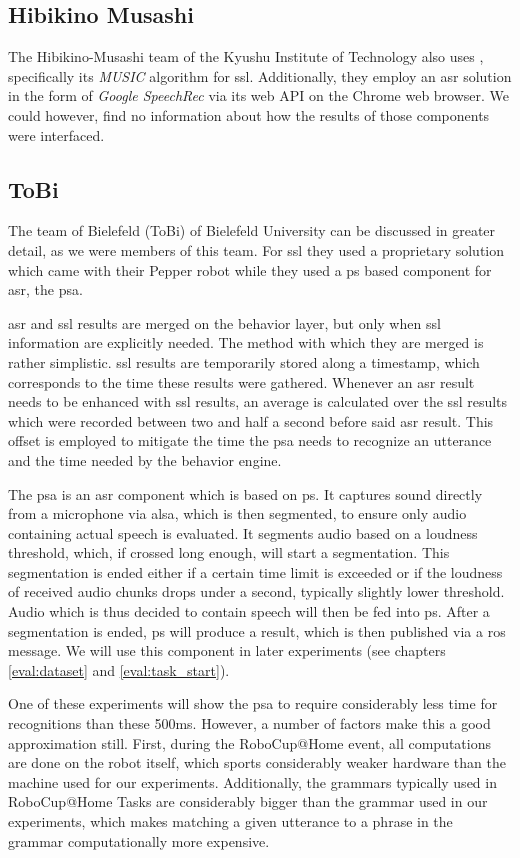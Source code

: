 \subsection{Hibikino Musashi}
The Hibikino-Musashi team of the Kyushu Institute of Technology also uses \HARK, specifically its \textit{MUSIC} algorithm for \gls{ssl}.
Additionally, they employ an \gls{asr} solution in the form of \textit{Google SpeechRec} via its web API on the Chrome web browser.
We could however, find no information about how the results of those components were interfaced.

\subsection{ToBi}
The team of Bielefeld (ToBi) of Bielefeld University can be discussed in greater detail, as we were members of this team.
For \gls{ssl} they used a proprietary solution which came with their Pepper robot %
while they used a \gls{ps} based component for \gls{asr}, the \gls{psa}. 

\gls{asr} and \gls{ssl} results are merged on the behavior layer, but only when \gls{ssl} information are explicitly needed.
The method with which they are merged is rather simplistic.
\gls{ssl} results are temporarily stored along a timestamp, which corresponds to the time these results were gathered.
Whenever an \gls{asr} result needs to be enhanced with \gls{ssl} results, an average is calculated over the \gls{ssl} results which were recorded between two and half a second before said \gls{asr} result.
This offset is employed to mitigate the time the \gls{psa} needs to recognize an utterance and the time needed by the behavior engine. 

The \gls{psa} is an \gls{asr} component which is based on \gls{ps}. \label{related_work:psa}
It captures sound directly from a microphone via \gls{alsa}, which is then segmented, to ensure only audio containing actual speech is evaluated.
It segments audio based on a loudness threshold, which, if crossed long enough, will start a segmentation.
This segmentation is ended either if a certain time limit is exceeded or if the loudness of received audio chunks drops under a second, typically slightly lower threshold.
Audio which is thus decided to contain speech will then be fed into \gls{ps}.
After a segmentation is ended, \gls{ps} will produce a result, which is then published via a \gls{ros} message.
We will use this component in later experiments (see chapters \ref{eval:dataset} and \ref{eval:task_start}).

One of these experiments will show the \gls{psa} to require considerably less time for recognitions than these 500ms.
However, a number of factors make this a good approximation still.
First, during the RoboCup@Home event, all computations are done on the robot itself, which sports considerably weaker hardware than the machine used for our experiments.
Additionally, the grammars typically used in RoboCup@Home Tasks are considerably bigger than the grammar used in our experiments, which makes matching a given utterance to a phrase in the grammar computationally more expensive.